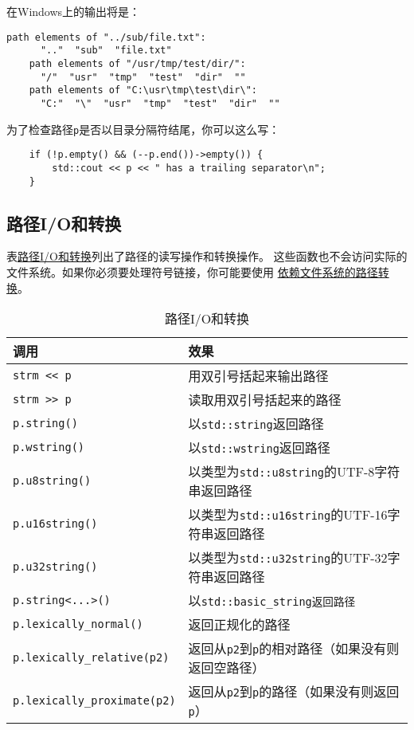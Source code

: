 在Windows上的输出将是：
\begin{lstlisting}[stringstyle=\color{black}]
    path elements of "../sub/file.txt":
      ".."  "sub"  "file.txt"
    path elements of "/usr/tmp/test/dir/":
      "/"  "usr"  "tmp"  "test"  "dir"  ""
    path elements of "C:\usr\tmp\test\dir\":
      "C:"  "\"  "usr"  "tmp"  "test"  "dir"  ""
\end{lstlisting}
为了检查路径\texttt{p}是否以目录分隔符结尾，你可以这么写：
\begin{lstlisting}
    if (!p.empty() && (--p.end())->empty()) {
        std::cout << p << " has a trailing separator\n";
    }
\end{lstlisting}

\subsection{路径I/O和转换}\label{ch20.3.3}
表\hyperref[t20.5]{路径I/O和转换}列出了路径的读写操作和转换操作。
这些函数也不会访问实际的文件系统。如果你必须要处理符号链接，你可能要使用
\hyperref[ch20.4.5]{依赖文件系统的路径转换}。
\begin{table}[ht]
    \centering
    \begin{tabular}{l|l}
        \hline
        \textbf{调用}                         & \textbf{效果}                                     \\
        \hline
        \texttt{strm << p}                  & 用双引号括起来输出路径                                     \\
        \texttt{strm >> p}                  & 读取用双引号括起来的路径                                    \\
        \texttt{p.string()}                 & 以\texttt{std::string}返回路径                       \\
        \texttt{p.wstring()}                & 以\texttt{std::wstring}返回路径                      \\
        \texttt{p.u8string()}               & 以类型为\texttt{std::u8string}的UTF-8字符串返回路径         \\
        \texttt{p.u16string()}              & 以类型为\texttt{std::u16string}的UTF-16字符串返回路径       \\
        \texttt{p.u32string()}              & 以类型为\texttt{std::u32string}的UTF-32字符串返回路径       \\
        \texttt{p.string<...>()}            & 以\texttt{std::basic\_string返回路径}                \\
        \texttt{p.lexically\_normal()}      & 返回正规化的路径                                        \\
        \texttt{p.lexically\_relative(p2)}  & 返回从\texttt{p2}到\texttt{p}的相对路径（如果没有则返回空路径）      \\
        \texttt{p.lexically\_proximate(p2)} & 返回从\texttt{p2}到\texttt{p}的路径（如果没有则返回\texttt{p}） \\
        \hline
    \end{tabular}
    \caption{路径I/O和转换}
    \label{t20.5}
\end{table}

